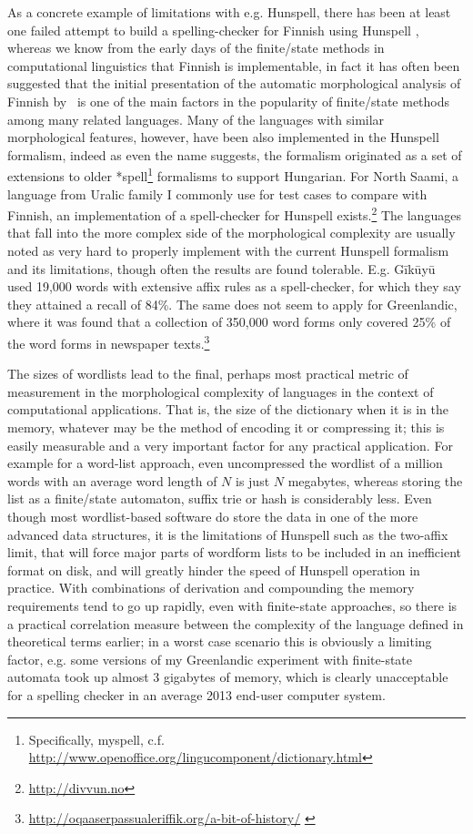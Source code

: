 \documentclass[officiallayout,final]{unihelcompling}
\begin{document}
As a concrete example of limitations with e.g. Hunspell, there has been at
least one failed attempt to build a spelling-checker for Finnish using Hunspell
\citep{pitkanen2006hunspell}, whereas we know from the early days of the
finite\-/state methods in computational linguistics that Finnish is
implementable, in fact it has often been suggested that the initial
presentation of the automatic morphological analysis of Finnish
by~\citet{koskenniemi1983twolevel} is one of the main factors in the popularity
of finite\-/state methods among many related languages. Many of the languages
with similar morphological features, however, have been also implemented in the
Hunspell \gls{formalism}, indeed as even the name suggests, the formalism
originated as a set of extensions to older *spell\footnote{Specifically,
myspell, c.f.  \url{http://www.openoffice.org/lingucomponent/dictionary.html}}
formalisms to support Hungarian.  For North Saami,  a language from Uralic
family I commonly use for test cases to compare with Finnish, an
implementation of a spell-checker for Hunspell
exists.\footnote{\url{http://divvun.no}} The languages that fall into the more
complex side of the morphological complexity are usually noted as very hard to
properly implement with the current Hunspell formalism and its limitations,
though often the results are found tolerable.  E.g.
Gīkūyū~\citet{chege2010developing} used 19,000 words with extensive affix rules
as a spell-checker, for which they say they attained a recall of 84\%.  The
same does not seem to apply for Greenlandic, where it was found that a
collection of 350,000 word forms only covered 25\% of the word forms in
newspaper
texts.\footnote{\url{http://oqaaserpassualeriffik.org/a-bit-of-history/}
\label{footnote:greenlandic}}

The sizes of wordlists lead to the final, perhaps most practical metric of
measurement in the morphological complexity of languages in the context of
computational applications. That is, the size of the dictionary when it is in
the memory, whatever may be the method of encoding it or compressing it; this
is easily measurable and a very important factor for any practical application.
For example for a word-list approach, even uncompressed the wordlist of a
million words with an average word length of $N$ is just $N$ megabytes, whereas
storing the list as a finite\-/state automaton, suffix trie or hash is
considerably less.  Even though most wordlist-based software do store the data
in one of the more advanced data structures, it is the limitations of Hunspell
such as the two-affix limit, that will force major parts of wordform lists to
be included in an inefficient format on disk, and will greatly hinder the speed
of Hunspell operation in practice. With combinations of derivation and
compounding the memory requirements tend to go up rapidly, even with
finite-state approaches, so there is a practical correlation measure between
the complexity of the language defined in theoretical terms earlier; in a worst
case scenario this is obviously a limiting factor, e.g. some versions of my
Greenlandic experiment with finite-state automata took up almost 3 gigabytes of
memory, which is clearly unacceptable for a spelling checker in an average 2013
end-user computer system.
\end{document}
